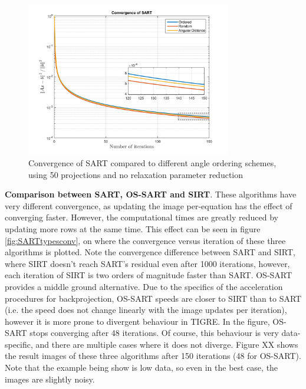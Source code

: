 \begin{figure}[H]
\begin{center}

\includegraphics[width=0.8\textwidth]{Applications/SARTangles.png} 
\end{center}

\caption[Convergence of SART vs projection update order]{\label{fig:SARTanglesconv} Convergence of SART compared to different angle ordering schemes, using 50 projections and no relaxation parameter reduction} 
\end{figure}

\textbf{Comparison between SART, OS-SART and SIRT}. These algorithms have very different convergence, as updating the image per-equation has the effect of converging faster. However, the computational times are greatly reduced by updating more rows at the same time. This effect can be seen in figure \ref{fig:SARTtypesconv}, on where the convergence versus iteration of these three algorithms is plotted. Note the convergence difference between SART and SIRT, where SIRT doesn't reach SART's residual even after 1000 iterations, however, each iteration of SIRT is two orders of magnitude faster than SART. OS-SART provides a middle ground alternative. Due to the specifics of the acceleration procedures for backprojection, OS-SART speeds are closer to SIRT than to SART (i.e. the speed does not change linearly with the image updates per iteration), however it is more prone to divergent behaviour in TIGRE. In the figure, OS-SART stops converging after 48 iterations. Of course, this behaviour is very data-specific, and there are multiple cases where it does not diverge. Figure XX shows the result images of these three algorithms after 150 iterations (48 for OS-SART). Note that the example being show is low data, so even in the best case, the images are slightly noisy.



